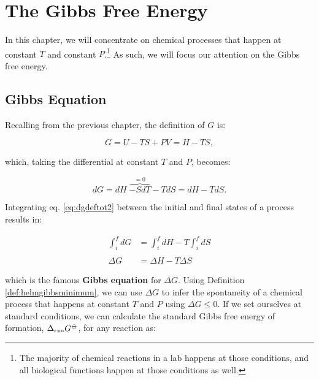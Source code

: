 \documentclass[
]{book}
\theoremstyle{definition}
\theoremstyle{definition}
\theoremstyle{definition}
\theoremstyle{remark}
\begin{document}
\renewcommand*{\standardstate}{{-\kern-6pt{\ominus}\kern-6pt-}}

\hypertarget{GibbsFree}{%
\chapter{The Gibbs Free Energy}\label{GibbsFree}}

In this chapter, we will concentrate on chemical processes that happen at constant \(T\) and constant \(P\).\footnote{The majority of chemical reactions in a lab happens at those conditions, and all biological functions happen at those conditions as well.} As such, we will focus our attention on the Gibbs free energy.

\hypertarget{gibbseqsec}{%
\section{Gibbs Equation}\label{gibbseqsec}}

Recalling from the previous chapter, the definition of \(G\) is:

\begin{equation}
G = U -TS +PV = H-TS,
\label{eq:dgdeftot}
\end{equation}

which, taking the differential at constant \(T\) and \(P\), becomes:

\begin{equation}
dG = dH \; \overbrace{-SdT}^{=0} -TdS = dH -TdS.
\label{eq:dgdeftot2}
\end{equation}

Integrating eq. \eqref{eq:dgdeftot2} between the initial and final states of a process results in:

\begin{equation}
\begin{aligned}
\int_i^f dG &= \int_i^f dH -T \int_i^f dS \\
\\
\Delta G &= \Delta H -T \Delta S
\end{aligned}
\label{eq:gibbseq}
\end{equation}

which is the famous \textbf{Gibbs equation} for \(\Delta G\). Using Definition \ref{def:helmgibbsminimum}, we can use \(\Delta G\) to infer the spontaneity of a chemical process that happens at constant \(T\) and \(P\) using \(\Delta G \leq 0\). If we set ourselves at standard conditions, we can calculate the standard Gibbs free energy of formation, \(\Delta_{\text{rxn}} G^{-\kern-6pt{\ominus}\kern-6pt-}\), for any reaction as:
\end{document}
